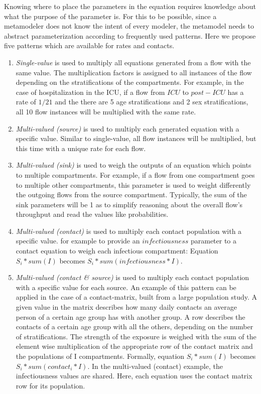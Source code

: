Knowing where to place the parameters in the equation requires knowledge about what the purpose of the parameter is. For this to be possible, since a metamodeler does not know the intent of every modeler, the metamodel needs to abstract parameterization according to frequently used patterns. Here we propose five patterns which are available for rates and contacts.
\begin{enumerate}
    \item \textit{Single-value} is used to multiply all equations generated from a flow with the same value. The multiplication factors is assigned to all instances of the flow depending on the stratifications of the compartments. For example, in the case of hospitalization in the ICU, if a flow from $ICU$ to $post-ICU$ has a rate of $1/21$ and the there are 5 age stratifications and 2 sex stratifications, all 10 flow instances will be multiplied with the same rate.
    \item \textit{Multi-valued (source)} is used to multiply each generated equation with a specific value. Similar to single-value, all flow instances will be multiplied, but this time with a unique rate for each flow.
    \item \textit{Multi-valued (sink)} is used to weigh the outputs of an equation which points to multiple compartments. For example, if a flow from one compartment goes to multiple other compartments, this parameter is used to weight differently the outgoing flows from the source compartment. Typically, the sum of the sink parameters will be 1 as to simplify reasoning about the overall flow's throughput and read the values like probabilities.
    \item \textit{Multi-valued (contact)} is used to multiply each contact population with a specific value. for example to provide an $infectiousness$ parameter to a contact equation to weigh each infectious compartment:
    Equation $S_i * sum(I)$ becomes $S_i * sum(infectiousness * I)$.
    \item \textit{Multi-valued (contact \& source)} is used to multiply each contact population with a specific value for each source. An example of this pattern can be applied in the case of a contact-matrix, built from a large population study. A given value in the matrix describes how many daily contacts an average person of a certain age group has with another group. A row describes the contacts of a certain age group with all the others, depending on the number of stratifications. The strength of the exposure is weighed with the sum of the element wise multiplication of the appropriate row of the contact matrix and the populations of I compartments. Formally, equation $S_i * sum(I)$ becomes $S_i * sum(contact_i * I)$. In the multi-valued (contact) example, the infectiousness values are shared. Here, each equation uses the contact matrix row for its population.
\end{enumerate}


